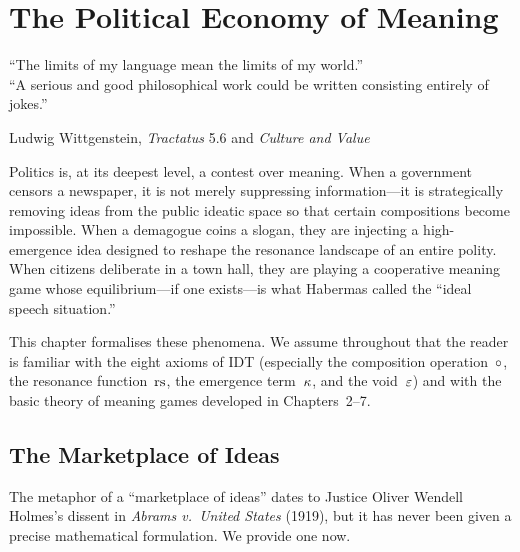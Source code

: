 

\chapter{The Political Economy of Meaning}
\label{ch:political-economy}

\epigraph{``The limits of my language mean the limits of my world.''\\ \medskip
``A serious and good philosophical work could be written consisting
entirely of jokes.''}{Ludwig Wittgenstein, \textit{Tractatus} 5.6 and \textit{Culture and Value}}

Politics is, at its deepest level, a contest over meaning.
When a government censors a newspaper, it is not merely suppressing
information---it is strategically removing ideas from the public
ideatic space so that certain compositions become impossible.
When a demagogue coins a slogan, they are injecting a high-emergence
idea designed to reshape the resonance landscape of an entire polity.
When citizens deliberate in a town hall, they are playing a
cooperative meaning game whose equilibrium---if one exists---is
what Habermas called the ``ideal speech situation.''

This chapter formalises these phenomena.  We assume throughout that
the reader is familiar with the eight axioms of IDT (especially the
composition operation~$\circ$, the resonance function~$\mathrm{rs}$,
the emergence term~$\kappa$, and the void~$\varepsilon$) and with
the basic theory of meaning games developed in Chapters~2--7.

\section{The Marketplace of Ideas}
\label{sec:marketplace}

The metaphor of a ``marketplace of ideas'' dates to Justice Oliver
Wendell Holmes's dissent in \textit{Abrams v.\ United States} (1919),
but it has never been given a precise mathematical formulation.
We provide one now.

